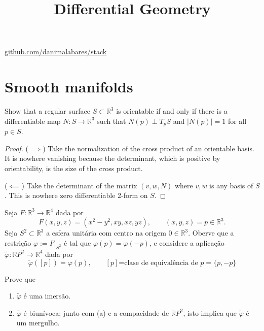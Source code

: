 



\title{Differential Geometry}
\maketitle

\label{section-phantom}
\hfill
\href{http://github.com/danimalabares/stack}{github.com/danimalabares/stack}
\tableofcontents

\section{Smooth manifolds}
\label{section-smooth-manifolds}

\begin{exercise}
\label{exercise-orientable-surfaces}
Show that a regular surface $S \subset \mathbb{R}^3$
is orientable if and only if there is a differentiable
map $N:S \to \mathbb{R}^3$ such that $N(p) \perp T_pS$
and $|N(p)|=1$ for all $p \in S$.
\end{exercise}

\begin{proof}
($\implies$) Take the normalization of the cross product of an orientable basis.
It is nowhere vanishing because the determinant,
which is positive by orientability,
is the size of the cross product.

($\impliedby$) Take the determinant of the matrix $(v,w,N)$
where $v,w$ is any basis of $S$.
This is nowhere zero differentiable 2-form on $S$.
\end{proof}

\begin{exercise}
\label{exercise-p2-in-r4}
Seja \(F:\mathbb{R}^3 \to \mathbb{R}^4\) dada por
\[F(x,y,z)=(x^2-y^2,xy,xz,yz),\qquad (x,y,z) = p \in \mathbb{R}^3.\]
Seja \(S^2 \subset \mathbb{R}^3\) a esfera unitária com centro na origem \(0 \in \mathbb{R}^3\). Oberve que a restrição \( \varphi:= F|_{S^2}\) é tal que \(\varphi(p)=\varphi(-p)\), e considere a aplicação \(\tilde{\varphi}:\mathbb{R}P^2 \to \mathbb{R}^4\) dada por
\[\tilde{ \varphi}([p])=\varphi(p),\qquad [p]\text{=clase de equivalência de \(p=\{p,-p\}\)} \]

Prove que
\begin{enumerate}
\item \(\tilde{\varphi}\) é uma imersão.
\item \(\tilde{\varphi}\) é biunívoca; junto com (a) e a compacidade de  \(\mathbb{R}P^2\), isto implica que \(\tilde{ \varphi}\) é um mergulho.
\end{enumerate}
\end{exercise}

